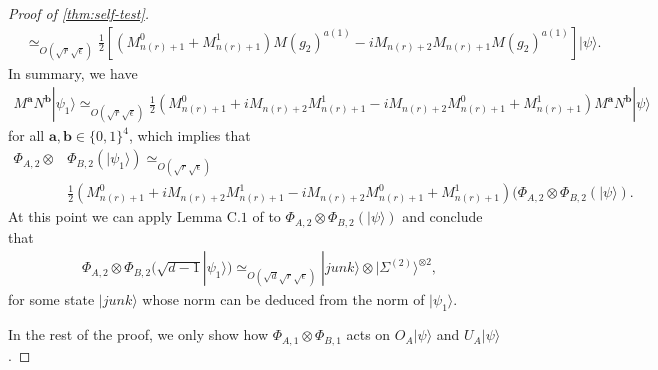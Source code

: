 \documentclass[11pt,letterpaper]{article}
\newcommand{\ket}[1]{|#1\rangle}
\newcommand{\x}{\otimes}
\newcommand{\1}{\mathbb{1}}
\newcommand{\EPR}[1]{\Sigma^{(#1)}}
\newcommand{\nr}{n(r)}
\newcommand{\ba}{\pmb{a}}
\newcommand{\bb}{\pmb{b}}
\newcommand{\se}{\sqrt{\epsilon}}
\newcommand{\sd}{\sqrt{d}}
\newcommand{\sr}{\sqrt{r}}
\newcommand{\appd}[1]{\simeq_{#1}}
\theoremstyle{definition}
\begin{document}
\begin{proof}[Proof of \cref{thm:self-test}]
\begin{align*}
	&\appd{O(\sr\se)}\frac{1}{2} [(M_{\nr+1}^0+M_{\nr+1}^1) M(g_2)^{a(1)} - iM_{\nr+2}M_{\nr+1}M(g_2)^{a(1)} ] \ket{\psi}.
\end{align*}
In summary, we have 
\begin{align}
	M^{\ba} N^{\bb} \ket{\psi_1} \appd{O(\sr\se)} \frac{1}{2} (M_{\nr+1}^0 + iM_{\nr+2}M_{\nr+1}^1 - iM_{\nr+2}M_{\nr+1}^0 + M_{\nr+1}^1)M^{\ba}N^{\bb} \ket{\psi}
\end{align}
for all $\ba, \bb \in \{0,1\}^4$, which implies that 
\begin{align*}
	\Phi_{A,2} \x& \Phi_{B,2}(\ket{\psi_1}) \appd{O(\sr\se)}\\
	 &\frac{1}{2} (M_{\nr+1}^0 + iM_{\nr+2}M_{\nr+1}^1 - iM_{\nr+2}M_{\nr+1}^0 + M_{\nr+1}^1)(\Phi_{A,2}\x\Phi_{B,2} (\ket{\psi}).
\end{align*}
At this point we can apply Lemma C.$1$ of \cite{wu2016} to $\Phi_{A,2}\x\Phi_{B,2} (\ket{\psi})$ and conclude that 
\begin{align}
	\Phi_{A,2} \x \Phi_{B,2}(\sqrt{d-1} \ket{\psi_1}) \appd{O(\sd \sr \se)} \ket{junk} \x \ket{\EPR{2}}^{\x 2},
\end{align} 
for some state $\ket{junk}$ whose norm can be deduced from the norm of $\ket{\psi_1}$.

In the rest of the proof, we only show how $\Phi_{A,1} \x \Phi_{B,1}$ acts on $O_A\ket{\psi}$ and $U_A\ket{\psi}$.


\end{proof}
\end{document}

